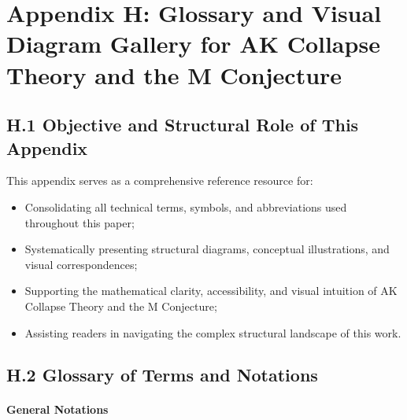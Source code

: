 \documentclass[11pt]{article}
\begin{document}

\section*{Appendix H: Glossary and Visual Diagram Gallery for AK Collapse Theory and the M Conjecture}

\subsection*{H.1 Objective and Structural Role of This Appendix}

This appendix serves as a comprehensive reference resource for:

\begin{itemize}
    \item Consolidating all technical terms, symbols, and abbreviations used throughout this paper;
    \item Systematically presenting structural diagrams, conceptual illustrations, and visual correspondences;
    \item Supporting the mathematical clarity, accessibility, and visual intuition of AK Collapse Theory and the M Conjecture;
    \item Assisting readers in navigating the complex structural landscape of this work.
\end{itemize}

\subsection*{H.2 Glossary of Terms and Notations}

\paragraph{General Notations}
\end{document}
